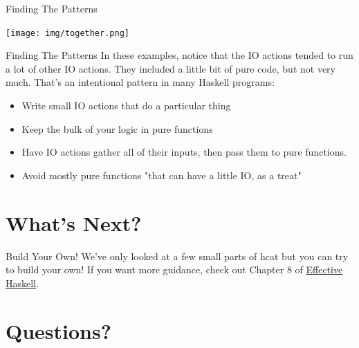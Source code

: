 \documentclass[10pt, presentation, colorlinks]{beamer}
\begin{document}
\begin{frame}[label={sec:orga8f99e2}]{Finding The Patterns}
\begin{center}
\texttt{[image: img/together.png]}
\end{center}
\end{frame}

\begin{frame}[label={sec:org76dbcbf}]{Finding The Patterns}
In these examples, notice that the IO actions tended to run a lot of
other IO actions. They included a little bit of pure code, but not
very much. That's an intentional pattern in many Haskell programs:

\bigskip

\begin{itemize}
\item Write small IO actions that do a particular thing
\item Keep the bulk of your logic in pure functions
\item Have IO actions gather all of their inputs, then pass them to pure functions.
\item Avoid mostly pure functions "that can have a little IO, as a treat"
\end{itemize}
\end{frame}

\section{What's Next?}
\label{sec:org10a436d}

\begin{frame}[label={sec:org9f050e4}]{Build Your Own!}
We've only looked at a few small parts of \alert{hcat} but you can try to
build your own! If you want more guidance, check out Chapter 8 of
\uline{Effective Haskell}.
\end{frame}

\section{Questions?}
\label{sec:org84b90a0}
\end{document}
